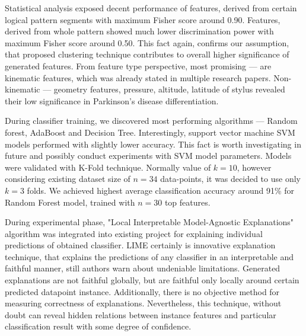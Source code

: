 
Statistical analysis exposed decent performance of features, derived from certain logical pattern segments with maximum Fisher score around 0.90. Features, derived from whole pattern showed much lower discrimination power with maximum Fisher score around 0.50. This fact again, confirms our assumption, that proposed clustering technique contributes to overall higher significance of generated features. From feature type perspective, most promising --- are kinematic features, which was already stated in multiple research papers. Non-kinematic --- geometry features, pressure, altitude, latitude of stylus revealed their low significance in Parkinson's disease differentiation. 


During classifier training, we discovered most performing algorithms --- Random forest, AdaBoost and Decision Tree. Interestingly, support vector machine SVM models performed with slightly lower accuracy. This fact is worth investigating in future and possibly conduct experiments with SVM model parameters. Models were validated with K-Fold technique. Normally value of $k = 10$, however considering existing dataset size of $n = 34$ data-points, it was decided to use only $k = 3$ folds. We achieved highest average classification accuracy around 91\% for Random Forest model, trained with $n=30$ top features.



During experimental phase, "Local Interpretable Model-Agnostic Explanations" algorithm was integrated into existing project for explaining individual predictions of obtained classifier. LIME certainly is innovative explanation technique, that explains the predictions of any classifier in an interpretable and faithful manner, still authors warn about undeniable limitations. Generated explanations are not faithful globally, but are faithful only locally around certain predicted datapoint instance. 
Additionally, there is no objective method for measuring correctness of explanations.
Nevertheless, this technique, without doubt can reveal hidden relations between instance features and particular classification result with some degree of confidence.


